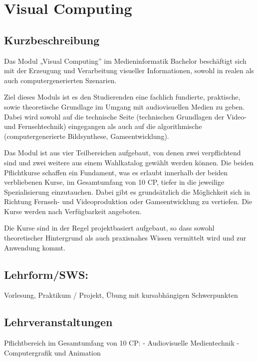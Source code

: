 \chapter{Visual Computing}\label{visual-computing}

\section{Kurzbeschreibung}\label{kurzbeschreibung-5}

Das Modul „Visual Computing'' im Medieninformatik Bachelor beschäftigt
sich mit der Erzeugung und Verarbeitung visueller Informationen, sowohl
in realen als auch computergenerierten Szenarien.

Ziel dieses Moduls ist es den Studierenden eine fachlich fundierte,
praktische, sowie theoretische Grundlage im Umgang mit audiovisuellen
Medien zu geben. Dabei wird sowohl auf die technische Seite (technischen
Grundlagen der Video- und Fernsehtechnik) eingegangen als auch auf die
algorithmische (computergenerierte Bildsynthese, Gameentwicklung).

Das Modul ist aus vier Teilbereichen aufgebaut, von denen zwei
verpflichtend sind und zwei weitere aus einem Wahlkatalog gewählt werden
können. Die beiden Pflichtkurse schaffen ein Fundament, was es erlaubt
innerhalb der beiden verbliebenen Kurse, im Gesamtumfang von 10 CP,
tiefer in die jeweilige Spezialisierung einzutauchen. Dabei gibt es
grundsätzlich die Möglichkeit sich in Richtung Fernseh- und
Videoproduktion oder Gameentwicklung zu vertiefen. Die Kurse werden nach
Verfügbarkeit angeboten.

Die Kurse sind in der Regel projektbasiert aufgebaut, so dass sowohl
theoretischer Hintergrund als auch praxisnahes Wissen vermittelt wird
und zur Anwendung kommt.

\section{Lehrform/SWS:}\label{lehrformsws-29}

Vorlesung, Praktikum / Projekt, Übung mit kursabhängigen Schwerpunkten

\section{Lehrveranstaltungen}\label{lehrveranstaltungen}

Pflichtbereich im Gesamtumfang von 10 CP: - Audiovisuelle Medientechnik
- Computergrafik und Animation

